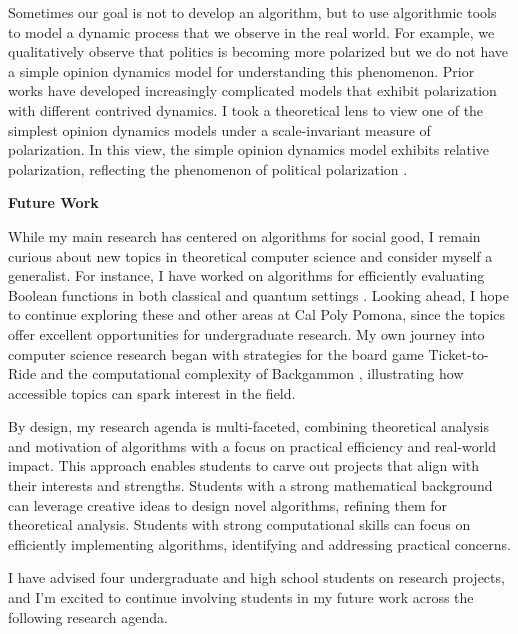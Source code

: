 \documentclass[11pt]{article}
\begin{document}
{Sometimes our goal is not to develop an algorithm, but to use algorithmic tools to model a dynamic process that we observe in the real world. For example, we qualitatively observe that politics is becoming more polarized but we do not have a simple opinion dynamics model for understanding this phenomenon. Prior works have developed increasingly complicated models that exhibit polarization with different contrived dynamics. I took a theoretical lens to view one of the simplest opinion dynamics models under a scale-invariant measure of polarization. In this view, the simple opinion dynamics model exhibits relative polarization, reflecting the phenomenon of political polarization \cite{musco2022quantify}.

\begin{center}
{\large \textbf{Future Work}}
\end{center}

While my main research has centered on algorithms for social good, I remain curious about new topics in theoretical computer science and consider myself a generalist. For instance, I have worked on algorithms for efficiently evaluating Boolean functions in both classical \cite{hellerstein2022adaptivity} and quantum settings \cite{czekanski2023robust,kimmel2021query,delorenzo2019applications}. Looking ahead, I hope to continue exploring these and other areas at Cal Poly Pomona, since the topics offer excellent opportunities for undergraduate research. My own journey into computer science research began with strategies for the board game Ticket-to-Ride \cite{witter2020applications} and the computational complexity of Backgammon \cite{witter2021backgammon}, illustrating how accessible topics can spark interest in the field.

By design, my research agenda is multi-faceted, combining theoretical analysis and motivation of algorithms with a focus on practical efficiency and real-world impact. This approach enables students to carve out projects that align with their interests and strengths. Students with a strong mathematical background can leverage creative ideas to design novel algorithms, refining them for theoretical analysis. Students with strong computational skills can focus on efficiently implementing algorithms, identifying and addressing practical concerns.

I have advised four undergraduate and high school students on research projects, and I'm excited to continue involving students in my future work across the following research agenda.

}
\end{document}
